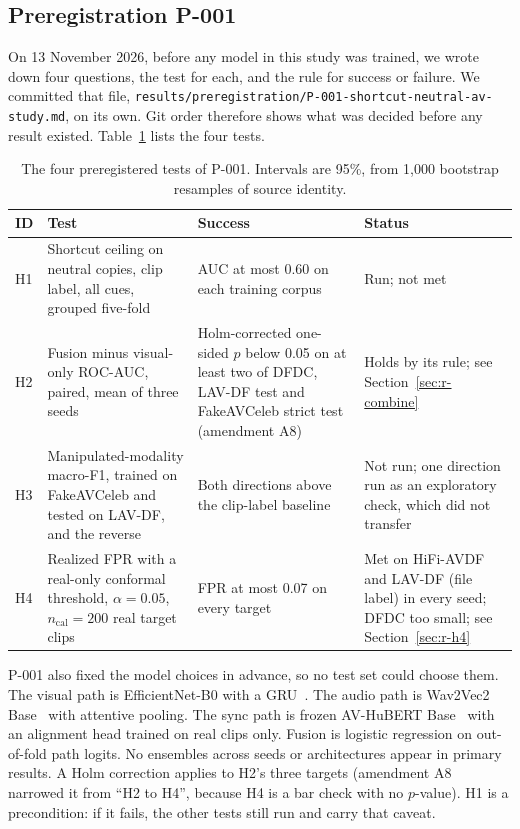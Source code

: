 \subsection{Preregistration P-001}
\label{sec:s-prereg}

On 13 November 2026, before any model in this study was trained, we wrote down
four questions, the test for each, and the rule for success or failure. We
committed that file, \texttt{results/\allowbreak preregistration/\allowbreak P-001-shortcut-neutral-av-study.md},
on its own. Git order therefore shows what was decided before any result
existed. Table~\ref{tab:hypotheses} lists the four tests.

\begin{table}[ht]
    \centering
    \small
    \caption{The four preregistered tests of P-001. Intervals are 95\%, from 1,000 bootstrap resamples of source identity.}
    \label{tab:hypotheses}
    \begin{tabularx}{\textwidth}{@{}l >{\raggedright\arraybackslash}X >{\raggedright\arraybackslash}p{3.6cm} >{\raggedright\arraybackslash}p{2.6cm}@{}}
        \toprule
        \textbf{ID} & \textbf{Test} & \textbf{Success} & \textbf{Status} \\
        \midrule
        H1 & Shortcut ceiling on neutral copies, clip label, all cues, grouped five-fold & AUC at most 0.60 on each training corpus & Run; not met \\
        H2 & Fusion minus visual-only ROC-AUC, paired, mean of three seeds & Holm-corrected one-sided $p$ below 0.05 on at least two of DFDC, LAV-DF test and FakeAVCeleb strict test (amendment A8) & Holds by its rule; see Section~\ref{sec:r-combine} \\
        H3 & Manipulated-modality macro-F1, trained on FakeAVCeleb and tested on LAV-DF, and the reverse & Both directions above the clip-label baseline & Not run; one direction run as an exploratory check, which did not transfer \\
        H4 & Realized FPR with a real-only conformal threshold, $\alpha = 0.05$, $n_{\mathrm{cal}} = 200$ real target clips & FPR at most 0.07 on every target & Met on HiFi-AVDF and LAV-DF (file label) in every seed; DFDC too small; see Section~\ref{sec:r-h4} \\
        \bottomrule
    \end{tabularx}
\end{table}

P-001 also fixed the model choices in advance, so no test set could choose
them. The visual path is EfficientNet-B0 with a GRU~\cite{efficientnet}. The
audio path is Wav2Vec2 Base~\cite{wav2vec2} with attentive pooling. The sync
path is frozen AV-HuBERT Base~\cite{avhubert} with an alignment head trained on
real clips only. Fusion is logistic regression on out-of-fold path logits. No
ensembles across seeds or architectures appear in primary results. A Holm
correction applies to H2's three targets (amendment A8 narrowed it from ``H2 to
H4'', because H4 is a bar check with no $p$-value). H1 is a precondition: if it fails, the
other tests still run and carry that caveat.

